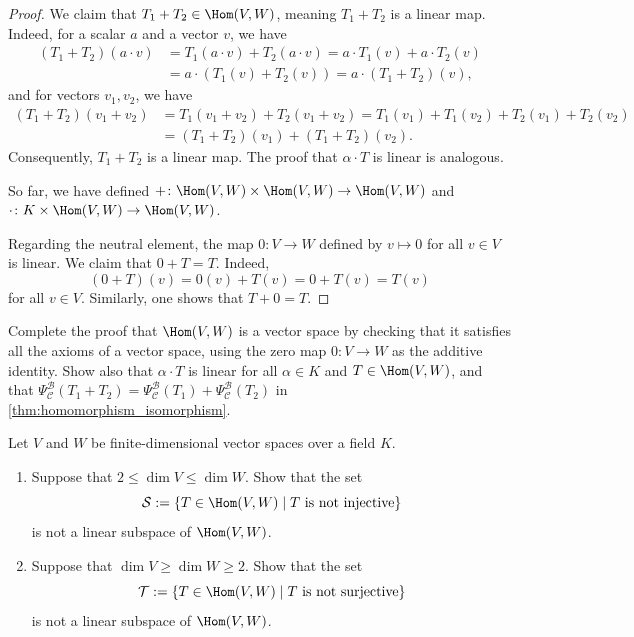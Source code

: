 \begin{proof}
  We claim that $T_1 + T_2 \in \Hom(V,W)$, meaning $T_1 + T_2$ is a linear map. Indeed, for a scalar $a$ and a vector $v$, we have
  \begin{align*}
    (T_1 + T_2)(a \cdot v) &= T_1(a \cdot v) + T_2(a \cdot v) = a \cdot T_1(v) + a \cdot T_2(v) \\
    &= a \cdot (T_1(v) + T_2(v)) = a \cdot (T_1 + T_2)(v),
  \end{align*}
  and for vectors $v_1, v_2$, we have
  \begin{align*}
    (T_1 + T_2)(v_1 + v_2) &= T_1(v_1 + v_2) + T_2(v_1 + v_2) = T_1(v_1) + T_1(v_2) + T_2(v_1) + T_2(v_2) \\
    &= (T_1 + T_2)(v_1) + (T_1 + T_2)(v_2).
  \end{align*}
  Consequently, $T_1 + T_2$ is a linear map. The proof that $\alpha \cdot T$ is linear is analogous.

  So far, we have defined $+ \colon \Hom(V,W) \times \Hom(V,W) \to \Hom(V,W)$ and $\cdot \colon K \times \Hom(V,W) \to \Hom(V,W)$.

  Regarding the neutral element, the map $0 \colon V \to W$ defined by $v \mapsto 0$ for all $v \in V$ is linear. We claim that $0 + T = T$. Indeed,
  \[ (0 + T)(v) = 0(v) + T(v) = 0 + T(v) = T(v) \]
  for all $v \in V$. Similarly, one shows that $T + 0 = T$.
\end{proof}

\begin{exercise}
  \label{exc:hom_axioms}
  Complete the proof that $\Hom(V,W)$ is a vector space by checking that it satisfies all the axioms of a vector space, using the zero map $0 \colon V \to W$ as the additive identity. Show also that $\alpha \cdot T$ is linear for all $\alpha \in K$ and $T \in \Hom(V,W)$, and that $\Psi_{\mathcal{C}}^{\mathcal{B}}(T_1 + T_2) = \Psi_{\mathcal{C}}^{\mathcal{B}}(T_1) + \Psi_{\mathcal{C}}^{\mathcal{B}}(T_2)$ in \cref{thm:homomorphism_isomorphism}.
\end{exercise}

\begin{exercise}
\label{exc:hom_non_injective_non_surjective_not_subspaces}
Let $V$ and $W$ be finite-di\-men\-sional vector spaces over a field $K$.
\begin{enumerate}
    \item Suppose that $2 \le \dim V \le \dim W$. Show that the set
    \[
    \mathcal{S} := \{T \in \Hom(V, W) \mid T \text{ is not injective}\}
    \]
    is not a linear subspace of $\Hom(V, W)$.
    \item Suppose that $\dim V \ge \dim W \ge 2$. Show that the set
    \[
    \mathcal{T} := \{T \in \Hom(V, W) \mid T \text{ is not surjective}\}
    \]
    is not a linear subspace of $\Hom(V, W)$.
\end{enumerate}
\end{exercise}

